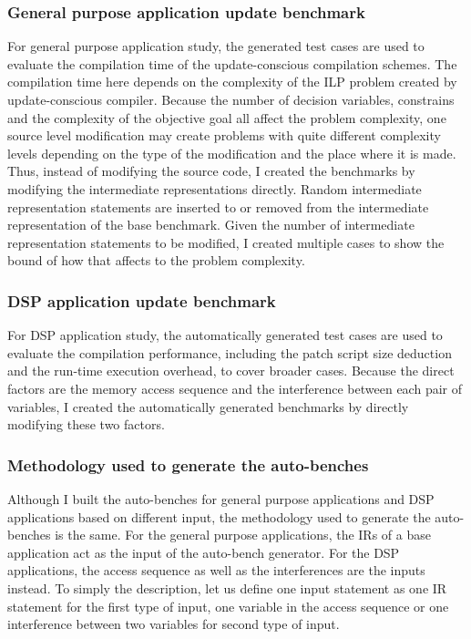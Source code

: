 \subsubsection{General purpose application update benchmark}
For general purpose application study, 
the generated test cases are used to evaluate the compilation time of the update-conscious compilation schemes. The compilation time here depends on the complexity of the
ILP problem created by update-conscious compiler.  
Because the number of decision variables, constrains and the complexity of
the objective goal all affect the problem complexity, one source level modification may create problems with
quite different complexity levels depending on the type of the modification
and the place where it is made. 
Thus, instead of modifying the source code, I created the benchmarks
by modifying the intermediate representations directly.
Random intermediate representation statements are inserted to or removed from the 
intermediate representation of the base benchmark.
Given the number of intermediate representation statements to be modified,
I created multiple cases to show the bound of how that affects to the problem complexity.

\subsubsection{DSP application update benchmark}
For DSP application study, the automatically generated test cases are used to evaluate
the compilation performance, including the patch script size deduction and
the run-time execution overhead, to cover broader cases.
Because the direct factors are the memory access sequence and the interference
between each pair of variables, I created the automatically generated 
benchmarks by directly modifying these two factors.

\subsubsection{Methodology used to generate the auto-benches}
Although I built the auto-benches for general purpose applications and DSP applications
based on different input, the methodology used to generate the auto-benches is the same.
For the general purpose applications, the IRs of a base application act as the input of
the auto-bench generator. 
For the DSP applications, the access sequence as well as the interferences
are the inputs instead.
To simply the description, let us define one input statement as one IR statement for the first type of input, 
one variable in the access sequence or one interference between
two variables for second type of input.


